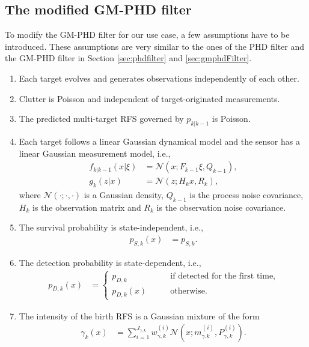\subsection{The modified GM-PHD filter}
To modify the GM-PHD filter for our use case, a few assumptions have to be introduced. These assumptions are very
similar to the ones of the PHD filter and the GM-PHD filter in Section \ref{sec:phdfilter} and \ref{sec:gmphdFilter}.
\begin{enumerate}
  \item Each target evolves and generates observations independently of each other. \label{as:mphd_1}
  \item Clutter is Poisson and independent of target-originated measurements. \label{as:mphd_2}
  \item The predicted multi-target RFS governed by $p_{k|k-1}$ is Poisson. \label{as:mphd_3}
  \item Each target follows a linear Gaussian dynamical model and the sensor has a linear \label{as:mphd_4}
  Gaussian measurement model, i.e.,
  \begin{align}
    f_{k|k-1}(x|\xi) &= \mathcal{N}(x; F_{k-1}\xi, Q_{k-1}),\\
    g_k(z|x) &= \mathcal{N}(z;H_kx, R_k),
  \end{align}
  where $\mathcal{N}(\cdot;\cdot,\cdot)$ is a Gaussian density, $Q_{k-1}$ is the process noise covariance, $H_k$ is the observation matrix and $R_k$ is the observation noise covariance.
  \item The survival probability is state-independent, i.e.,
  \begin{align}
    p_{S,k}(x) &= p_{S,k}.
  \end{align}
    \label{as:mphd_5}
  \item The detection probability is state-dependent, i.e.,
    \begin{align}
      p_{D,k}(x) &= 
      \begin{cases}
         p_{D,k} &\qquad \text{if detected for the first time,} \\
         p_{D,k}(x) &\qquad \text{otherwise.}
      \end{cases}
    \end{align}
    \label{as:mphd_6}
  \item The intensity of the birth RFS is a Gaussian mixture of the form
  \begin{align}
    \gamma_k(x) &= \sum_{i=1}^{J_{\gamma,k}}w_{\gamma,k}^{(i)} \mathcal{N}\left(x; m_{\gamma.k}^{(i)}, P_{\gamma,k}^{(i
    )}\right).
    \label{eq:mphd_intensity}
  \end{align}
  \label{as:mphd_7}
\end{enumerate}
